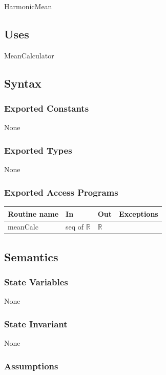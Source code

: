 \documentclass[12pt,fleqn]{examtst}
\begin{document}
HarmonicMean

\subsection* {Uses}

MeanCalculator

\subsection* {Syntax}

\subsubsection* {Exported Constants}

None

\subsubsection* {Exported Types}

None 

\subsubsection* {Exported Access Programs}

\begin{tabular}{| l | l | l | p{5cm} |}
\hline
\textbf{Routine name} & \textbf{In} & \textbf{Out} & \textbf{Exceptions}\\
\hline
meanCalc & seq of $\mathbb{R}$ & $\mathbb{R}$ & ~\\
\hline
\end{tabular}

\subsection* {Semantics}

\subsubsection* {State Variables}

None

\subsubsection* {State Invariant}

None

\subsubsection* {Assumptions}
\end{document}
